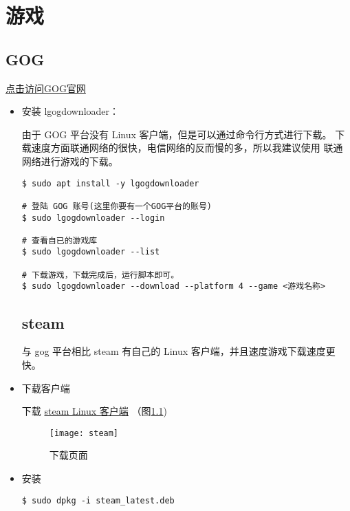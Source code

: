 \chapter{游戏}

\section{GOG} 

\href{https://www.gog.com/}{点击访问GOG官网}
\begin{itemize} 
\item 安装 lgogdownloader：

由于 GOG 平台没有 Linux 客户端，但是可以通过命令行方式进行下载。
下载速度方面联通网络的很快，电信网络的反而慢的多，所以我建议使用
联通网络进行游戏的下载。

\begin{lstlisting}
$ sudo apt install -y lgogdownloader

# 登陆 GOG 账号(这里你要有一个GOG平台的账号)
$ sudo lgogdownloader --login 

# 查看自已的游戏库
$ sudo lgogdownloader --list

# 下载游戏，下载完成后，运行脚本即可。
$ sudo lgogdownloader --download --platform 4 --game <游戏名称>
\end{lstlisting}
\newpage

\section{steam}

与 gog 平台相比 steam 有自己的 Linux 客户端，并且速度游戏下载速度更快。

\item 下载客户端

下载 \href{https://store.steampowered.com/about/}{steam Linux 客户端} 
（图\ref{fig-steam})

\begin{figure}[hbt!]  
	\centering
	\texttt{[image: steam]}
	\caption{下载页面} %
	\label{fig-steam} %
\end{figure}

\item 安装
\begin{lstlisting}
$ sudo dpkg -i steam_latest.deb
\end{lstlisting}

\end{itemize}
